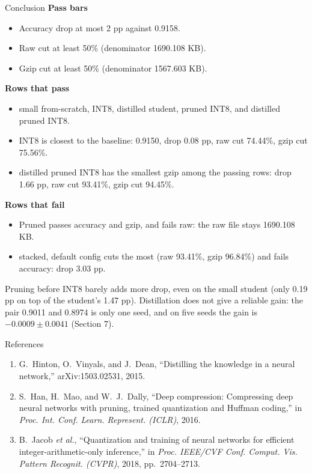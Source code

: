 \documentclass[aspectratio=169,11pt]{beamer}
\begin{document}
\begin{frame}[t]{Conclusion}
  \footnotesize
  \setlength{\itemsep}{1pt}%
  \textbf{Pass bars}
  \begin{itemize}
    \item Accuracy drop at most 2 pp against 0.9158.
    \item Raw cut at least 50\% (denominator 1690.108 KB).
    \item Gzip cut at least 50\% (denominator 1567.603 KB).
  \end{itemize}
  \vspace{0.15em}
  \textbf{Rows that pass}
  \begin{itemize}
    \item small from-scratch, INT8, distilled student, pruned INT8, and distilled pruned INT8.
    \item INT8 is closest to the baseline: 0.9150, drop 0.08 pp, raw cut 74.44\%, gzip cut 75.56\%.
    \item distilled pruned INT8 has the smallest gzip among the passing rows: drop 1.66 pp, raw cut 93.41\%, gzip cut 94.45\%.
  \end{itemize}
  \vspace{0.15em}
  \textbf{Rows that fail}
  \begin{itemize}
    \item Pruned passes accuracy and gzip, and fails raw: the raw file stays 1690.108 KB.
    \item stacked, default config cuts the most (raw 93.41\%, gzip 96.84\%) and fails accuracy: drop 3.03 pp.
  \end{itemize}
  \vspace{0.12em}
  Pruning before INT8 barely adds more drop, even on the small student (only 0.19 pp on top of the student's 1.47 pp).
  \vspace{0.12em}
  Distillation does not give a reliable gain: the pair 0.9011 and 0.8974 is only one seed, and on five seeds the gain is \(-0.0009 \pm 0.0041\) (Section 7).
\end{frame}

\begin{frame}{References}
  \scriptsize
  \begin{enumerate}\setlength{\itemsep}{0.55em}
    \item G.~Hinton, O.~Vinyals, and J.~Dean, ``Distilling the knowledge in a neural network,'' arXiv:1503.02531, 2015.
    \item S.~Han, H.~Mao, and W.~J.~Dally, ``Deep compression: Compressing deep neural networks with pruning, trained quantization and Huffman coding,'' in \textit{Proc. Int. Conf. Learn. Represent. (ICLR)}, 2016.
    \item B.~Jacob \textit{et al.}, ``Quantization and training of neural networks for efficient integer-arithmetic-only inference,'' in \textit{Proc. IEEE/CVF Conf. Comput. Vis. Pattern Recognit. (CVPR)}, 2018, pp.~2704--2713.
  \end{enumerate}
\end{frame}
\end{document}
